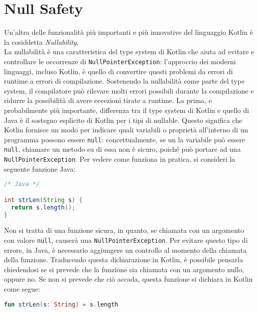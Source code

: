 \section{Null Safety}
Un'altra delle funzionalità più importanti e più innovative del linguaggio Kotlin è la cosiddetta {\em Nullability}.\\
La nullabilità è una caratteristica del type system di Kotlin che aiuta ad evitare e controllare le occorrenze di \texttt{NullPointerException}: l'approccio dei moderni linguaggi, incluso Kotlin, è quello di convertire questi problemi da errori di runtime a errori di compilazione. Sostenendo la nullabilità come parte del type system, il compilatore può rilevare molti errori possibili durante la compilazione e ridurre la possibilità di avere eccezioni tirate a runtime. La prima, e probabilmente più importante, differenza tra il type system di Kotlin e quello di Java è il sostegno esplicito di Kotlin per i tipi di nullable. Questo significa che Kotlin fornisce un modo per indicare quali variabili o proprietà all'interno di un programma possono essere \texttt{null}: concettualmente, se un la variabile può essere \texttt{null}, chiamare un metodo su di essa non è sicuro, poiché può portare ad una \texttt{NullPointerException}. Per vedere come funziona in pratica, si consideri la seguente funzione Java:\\

\begin{lstlisting}[caption={Funzione \texttt{strLen} definita in Java}, captionpos=b, label={lst:exampleNullJava}, language=Java]
/* Java */

int strLen(String s) {
  return s.length();
}
\end{lstlisting}
Non si tratta di una funzione sicura, in quanto, se chiamata con un argomento con valore \texttt{null}, causerà una \texttt{NullPointerException}. Per evitare questo tipo di errore, in Java, è necessario aggiungere un controllo al momento della chiamata della funzione. Traducendo questa dichiarazione in Kotlin, è possibile pensarla chiedendosi se si prevede che la funzione sia chiamata con un argomento nullo, oppure no. Se non si prevede che ciò accada, questa funzione si dichiara in Kotlin come segue:\\

\begin{lstlisting}[caption={Funzione Kotlin che non accetta \texttt{null} come argomento}, captionpos=b, label={lst:exampleNullKt}, language=Kotlin]
fun strLen(s: String) = s.length
\end{lstlisting}

